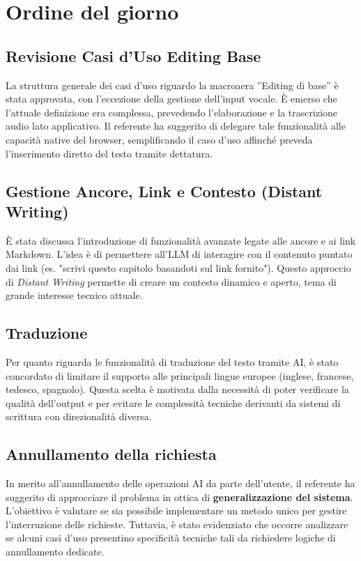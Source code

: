 \documentclass[a4paper, 10pt, colorlinks=true, linkcolor=black, urlcolor=blue, citecolor=blue, hidelinks]{article}
\begin{document}
\section{Ordine del giorno}

\subsection{Revisione Casi d'Uso Editing Base}
La struttura generale dei casi d'uso riguardo la macroaera ''Editing di base'' è stata approvata, con l'eccezione della gestione dell'input vocale. È emerso che l'attuale definizione era complessa, prevedendo l'elaborazione e la trascrizione audio lato applicativo. Il referente ha suggerito di delegare tale funzionalità alle capacità native del browser, semplificando il caso d'uso affinché preveda l'inserimento diretto del testo tramite dettatura.

\subsection{Gestione Ancore, Link e Contesto (Distant Writing)}
È stata discussa l'introduzione di funzionalità avanzate legate alle ancore e ai link Markdown. L'idea è di permettere all'LLM di interagire con il contenuto puntato dai link (es. "scrivi questo capitolo basandoti sul link fornito"). Questo approccio di \textit{Distant Writing} permette di creare un contesto dinamico e aperto, tema di grande interesse tecnico attuale.

\subsection{Traduzione}
Per quanto riguarda le funzionalità di traduzione del testo tramite AI, è stato concordato di limitare il supporto alle principali lingue europee (inglese, francese, tedesco, spagnolo). Questa scelta è motivata dalla necessità di poter verificare la qualità dell'output e per evitare le complessità tecniche derivanti da sistemi di scrittura con direzionalità diversa.

\subsection{Annullamento della richiesta}
In merito all'annullamento delle operazioni AI da parte dell'utente, il referente ha suggerito di approcciare il problema in ottica di \textbf{generalizzazione del sistema}. L'obiettivo è valutare se sia possibile implementare un metodo unico per gestire l'interruzione delle richieste. Tuttavia, è stato evidenziato che occorre analizzare se alcuni casi d'uso presentino specificità tecniche tali da richiedere logiche di annullamento dedicate.
\end{document}
